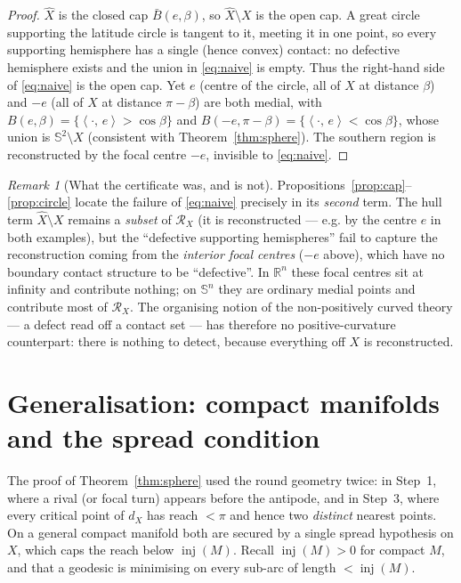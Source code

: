 \documentclass[11pt]{article}
\theoremstyle{remark}
\newtheorem{remark}[theorem]{Remark}
\newcommand{\R}{\mathbb{R}}
\newcommand{\X}{X}
\newcommand{\Xhat}{\widehat{\X}}
\newcommand{\Rx}{\mathcal{R}_{\X}}
\newcommand{\inj}{\operatorname{inj}}
\newcommand{\sca}[2]{\left\langle #1,\, #2\right\rangle}
\newcommand{\Sn}{\mathbb{S}^{n}}
\begin{document}
\begin{proof}
$\Xhat$ is the closed cap $\bar B(e,\beta)$, so $\Xhat\setminus\X$ is the
open cap. A great circle supporting the latitude circle is tangent to it,
meeting it in one point, so every supporting hemisphere has a single
(hence convex) contact: no defective hemisphere exists and the union in
\eqref{eq:naive} is empty. Thus the right-hand side of \eqref{eq:naive} is
the open cap. Yet $e$ (centre of the circle, all of $\X$ at distance
$\beta$) and $-e$ (all of $\X$ at distance $\pi-\beta$) are both medial,
with $B(e,\beta)=\{\sca{\cdot}{e}>\cos\beta\}$ and
$B(-e,\pi-\beta)=\{\sca{\cdot}{e}<\cos\beta\}$, whose union is
$\mathbb{S}^{2}\setminus\X$ (consistent with Theorem~\ref{thm:sphere}).
The southern region is reconstructed by the focal centre $-e$, invisible
to \eqref{eq:naive}.
\end{proof}

\begin{remark}[What the certificate was, and is not]\label{rem:cert}
Propositions~\ref{prop:cap}--\ref{prop:circle} locate the failure of
\eqref{eq:naive} precisely in its \emph{second} term. The hull term
$\Xhat\setminus\X$ remains a \emph{subset} of $\Rx$ (it is reconstructed
--- e.g. by the centre $e$ in both examples), but the ``defective
supporting hemispheres'' fail to capture the reconstruction coming from
the \emph{interior focal centres} ($-e$ above), which have no boundary
contact structure to be ``defective''. In $\R^{n}$ these focal centres sit
at infinity and contribute nothing; on $\Sn$ they are ordinary medial
points and contribute most of $\Rx$. The organising notion of the
non-positively curved theory --- a defect read off a contact set --- has
therefore no positive-curvature counterpart: there is nothing to detect,
because everything off $\X$ is reconstructed.
\end{remark}

\section{Generalisation: compact manifolds and the spread condition}
\label{sec:general}

The proof of Theorem~\ref{thm:sphere} used the round geometry twice: in
Step~1, where a rival (or focal turn) appears before the antipode, and in
Step~3, where every critical point of $d_{\X}$ has reach $<\pi$ and hence
two \emph{distinct} nearest points. On a general compact manifold both are
secured by a single spread hypothesis on $\X$, which caps the reach below
$\inj(M)$. Recall $\inj(M)>0$ for compact $M$, and that a geodesic is
minimising on every sub-arc of length $<\inj(M)$.
\end{document}
